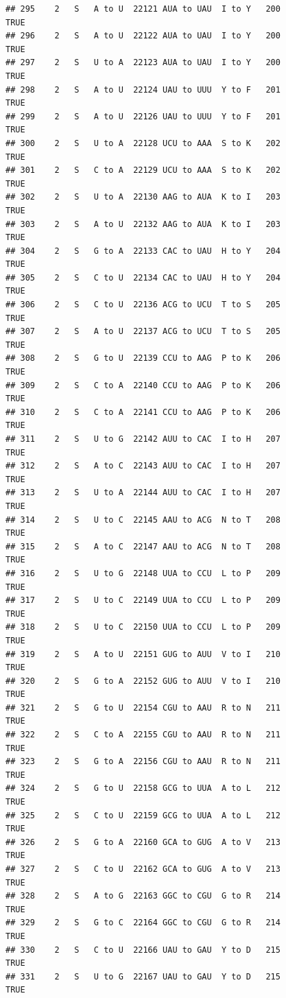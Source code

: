 \documentclass[
  12pt,
]{article}
\begin{document}
\begin{verbatim}
## 295    2   S   A to U  22121 AUA to UAU  I to Y   200           TRUE
## 296    2   S   A to U  22122 AUA to UAU  I to Y   200           TRUE
## 297    2   S   U to A  22123 AUA to UAU  I to Y   200           TRUE
## 298    2   S   A to U  22124 UAU to UUU  Y to F   201           TRUE
## 299    2   S   A to U  22126 UAU to UUU  Y to F   201           TRUE
## 300    2   S   U to A  22128 UCU to AAA  S to K   202           TRUE
## 301    2   S   C to A  22129 UCU to AAA  S to K   202           TRUE
## 302    2   S   U to A  22130 AAG to AUA  K to I   203           TRUE
## 303    2   S   A to U  22132 AAG to AUA  K to I   203           TRUE
## 304    2   S   G to A  22133 CAC to UAU  H to Y   204           TRUE
## 305    2   S   C to U  22134 CAC to UAU  H to Y   204           TRUE
## 306    2   S   C to U  22136 ACG to UCU  T to S   205           TRUE
## 307    2   S   A to U  22137 ACG to UCU  T to S   205           TRUE
## 308    2   S   G to U  22139 CCU to AAG  P to K   206           TRUE
## 309    2   S   C to A  22140 CCU to AAG  P to K   206           TRUE
## 310    2   S   C to A  22141 CCU to AAG  P to K   206           TRUE
## 311    2   S   U to G  22142 AUU to CAC  I to H   207           TRUE
## 312    2   S   A to C  22143 AUU to CAC  I to H   207           TRUE
## 313    2   S   U to A  22144 AUU to CAC  I to H   207           TRUE
## 314    2   S   U to C  22145 AAU to ACG  N to T   208           TRUE
## 315    2   S   A to C  22147 AAU to ACG  N to T   208           TRUE
## 316    2   S   U to G  22148 UUA to CCU  L to P   209           TRUE
## 317    2   S   U to C  22149 UUA to CCU  L to P   209           TRUE
## 318    2   S   U to C  22150 UUA to CCU  L to P   209           TRUE
## 319    2   S   A to U  22151 GUG to AUU  V to I   210           TRUE
## 320    2   S   G to A  22152 GUG to AUU  V to I   210           TRUE
## 321    2   S   G to U  22154 CGU to AAU  R to N   211           TRUE
## 322    2   S   C to A  22155 CGU to AAU  R to N   211           TRUE
## 323    2   S   G to A  22156 CGU to AAU  R to N   211           TRUE
## 324    2   S   G to U  22158 GCG to UUA  A to L   212           TRUE
## 325    2   S   C to U  22159 GCG to UUA  A to L   212           TRUE
## 326    2   S   G to A  22160 GCA to GUG  A to V   213           TRUE
## 327    2   S   C to U  22162 GCA to GUG  A to V   213           TRUE
## 328    2   S   A to G  22163 GGC to CGU  G to R   214           TRUE
## 329    2   S   G to C  22164 GGC to CGU  G to R   214           TRUE
## 330    2   S   C to U  22166 UAU to GAU  Y to D   215           TRUE
## 331    2   S   U to G  22167 UAU to GAU  Y to D   215           TRUE

\end{verbatim}
\end{document}
